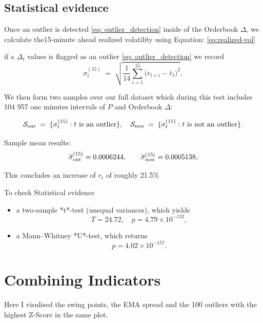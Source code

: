 \documentclass[12pt]{article}
\begin{document}
\newpage

\subsection*{\textbf{Statistical evidence}}

Once an outlier is detected \eqref{eq: outlier_detection} inside of the Orderbook $\Delta$, we calculate the15-minute ahead realized volatility using Equation: \eqref{eq:realized-vol}




if a $\Delta_t$ values is flagged as an outlier \eqref{eq: outlier_detection}
we record
$$
\sigma^{(15)}_t
\;=\;
\sqrt{\frac{1}{14}\sum_{i=1}^{15}\bigl(r_{t+i}-\bar r_{t}\bigr)^{2}},
$$

We then form two samples over our full dataset which during this test includes 104 957 one minutes intervals of $P$ and Orderbook $\Delta$:


$$
\mathcal{S}_{\rm out} \;=\;\{\sigma^{(15)}_t : t\text{ is an outlier}\},
\quad
\mathcal{S}_{\rm non} \;=\;\{\sigma^{(15)}_t : t\text{ is not an outlier}\}.
$$


Sample mean results:
$$
\overline{\sigma}^{(15)}_{\rm out}
=0.0006244,
\qquad
\overline{\sigma}^{(15)}_{\rm non}
=0.0005138,
$$




This concludes an increase of $r_t$ of roughly 21.5\%


To check Statistical evidence

\begin{itemize}
  \item a two-sample *t*-test (unequal variances), which yields
  $$
    T=24.72,\quad p=4.79\times10^{-132},
  $$
  \item a Mann–Whitney *U*-test, which returns
  $$
    p=4.02\times10^{-157}.
  $$
\end{itemize}










\newpage

\section*{Combining Indicators}
Here I visulised the swing points, the EMA spread and the 100 outliers with the highest Z-Score in the same plot.
\end{document}
